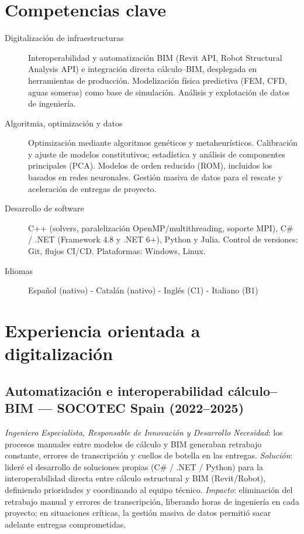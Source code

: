 \documentclass[11pt]{article}
\begin{document}
\section{Competencias clave}
\begin{description}
    \item[Digitalización de infraestructuras]
        Interoperabilidad y automatización BIM (Revit API, Robot Structural Analysis API) e integración directa cálculo--BIM, desplegada en herramientas de producción.
        Modelización física predictiva (FEM, CFD, aguas someras) como base de simulación.
        Análisis y explotación de datos de ingeniería.
    \item[Algoritmia, optimización y datos]
        Optimización mediante algoritmos genéticos y metaheurísticos.
        Calibración y ajuste de modelos constitutivos; estadística y análisis de componentes principales (PCA).
        Modelos de orden reducido (ROM), incluidos los basados en redes neuronales.
        Gestión masiva de datos para el rescate y aceleración de entregas de proyecto.
    \item[Desarrollo de software]
        C++ (solvers, paralelización OpenMP/multithreading, soporte MPI), C\# / .NET (Framework 4.8 y .NET 6+), Python y Julia.
        Control de versiones: Git, flujos CI/CD. Plataformas: Windows, Linux.
    \item[Idiomas] Español (nativo) - Catalán (nativo) - Inglés (C1) - Italiano (B1)
\end{description}


\section{Experiencia orientada a digitalización}

\subsection{Automatización e interoperabilidad cálculo--BIM --- SOCOTEC Spain (2022--2025)}
\parbox{\linewidth}{
    \emph{Ingeniero Especialista, Responsable de Innovación y Desarrollo} \newline
    \emph{Necesidad}: los procesos manuales entre modelos de cálculo y BIM generaban retrabajo constante, errores de transcripción y cuellos de botella en las entregas. \newline
    \emph{Solución}: lideré el desarrollo de soluciones propias (C\# / .NET / Python) para la interoperabilidad directa entre cálculo estructural y BIM (Revit/Robot), definiendo prioridades y coordinando al equipo técnico. \newline
    \emph{Impacto}: eliminación del retrabajo manual y errores de transcripción, liberando horas de ingeniería en cada proyecto; en situaciones críticas, la gestión masiva de datos permitió sacar adelante entregas comprometidas.}
\end{document}
